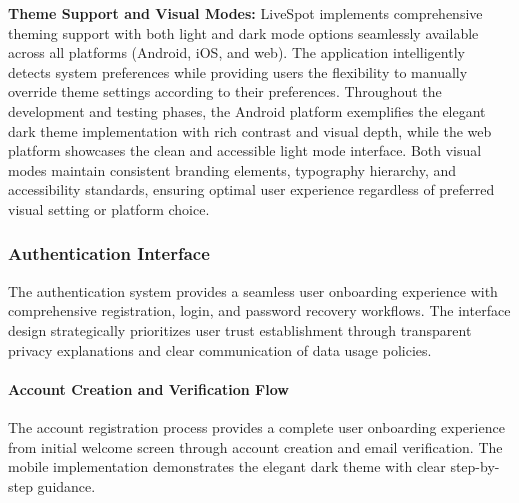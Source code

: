 \textbf{Theme Support and Visual Modes:}
LiveSpot implements comprehensive theming support with both light and dark mode options seamlessly available across all platforms (Android, iOS, and web). The application intelligently detects system preferences while providing users the flexibility to manually override theme settings according to their preferences. Throughout the development and testing phases, the Android platform exemplifies the elegant dark theme implementation with rich contrast and visual depth, while the web platform showcases the clean and accessible light mode interface. Both visual modes maintain consistent branding elements, typography hierarchy, and accessibility standards, ensuring optimal user experience regardless of preferred visual setting or platform choice.

\subsubsection{Authentication Interface}\label{subsubsec:auth_interface}

The authentication system provides a seamless user onboarding experience with comprehensive registration, login, and password recovery workflows. The interface design strategically prioritizes user trust establishment through transparent privacy explanations and clear communication of data usage policies.

\paragraph{Account Creation and Verification Flow}
The account registration process provides a complete user onboarding experience from initial welcome screen through account creation and email verification. The mobile implementation demonstrates the elegant dark theme with clear step-by-step guidance.

